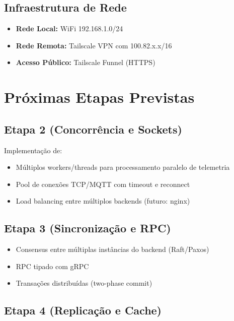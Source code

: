 \documentclass[12pt,a4paper,oneside]{report}
\begin{document}
\section{Infraestrutura de Rede}

\begin{itemize}
    \item \textbf{Rede Local:} WiFi 192.168.1.0/24
    \item \textbf{Rede Remota:} Tailscale VPN com 100.82.x.x/16
    \item \textbf{Acesso Público:} Tailscale Funnel (HTTPS)
\end{itemize}

\chapter{Próximas Etapas Previstas}

\section{Etapa 2 (Concorrência e Sockets)}

Implementação de:

\begin{itemize}
    \item Múltiplos workers/threads para processamento paralelo de telemetria
    \item Pool de conexões TCP/MQTT com timeout e reconnect
    \item Load balancing entre múltiplos backends (futuro: nginx)
\end{itemize}

\section{Etapa 3 (Sincronização e RPC)}

\begin{itemize}
    \item Consensus entre múltiplas instâncias do backend (Raft/Paxos)
    \item RPC tipado com gRPC
    \item Transações distribuídas (two-phase commit)
\end{itemize}

\section{Etapa 4 (Replicação e Cache)}
\end{document}
